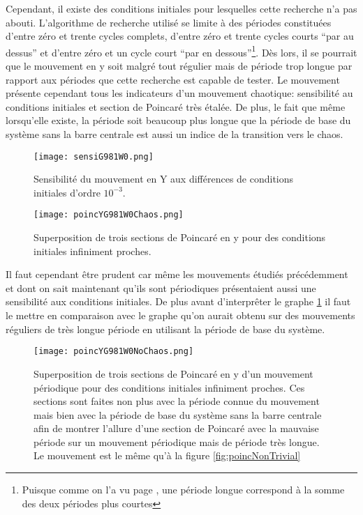 \documentclass[a4paper]{report}
\begin{document}
Cependant, il existe des conditions initiales pour lesquelles cette recherche n'a pas abouti. L'algorithme de recherche utilisé se limite à des périodes constituées d'entre zéro et trente cycles complets, d'entre zéro et trente cycles courts ``par au dessus'' et d'entre zéro et un cycle court ``par en dessous''\footnote{Puisque comme on l'a vu page \pageref{propr:sommePeriodes}, une période longue correspond à la somme des deux périodes plus courtes}. Dès lors, il se pourrait que le mouvement en y soit malgré tout régulier mais de période trop longue par rapport aux périodes que cette recherche est capable de tester. Le mouvement présente cependant tous les indicateurs d'un mouvement chaotique: sensibilité au conditions initiales et section de Poincaré très étalée. De plus, le fait que même lorsqu'elle existe, la période soit beaucoup plus longue que la période de base du système sans la barre centrale est aussi un indice de la transition vers le chaos.
\begin{figure}[h!]
   \texttt{[image: sensiG981W0.png]}
      \caption[Sensibilité aux conditions initiales: g=9.81 .]{Sensibilité du mouvement en Y aux différences de conditions initiales d'ordre \(10^{-3}\).}
\end{figure}
\begin{figure}[H]
   \texttt{[image: poincYG981W0Chaos.png]}
      \caption[Section de Poincaré en y: g=9.81 ]{Superposition de trois sections de Poincaré en y pour des conditions initiales infiniment proches.\label{fig:poincGChaos}}
\end{figure}
Il faut cependant être prudent car même les mouvements étudiés précédemment et dont on sait maintenant qu'ils sont périodiques présentaient aussi une sensibilité aux conditions initiales. De plus avant d'interprêter le graphe \ref{fig:poincGChaos} il faut le mettre en comparaison avec le graphe qu'on aurait obtenu sur des mouvements réguliers de très longue période en utilisant la période de base du système.
\begin{figure}[h!]
   \texttt{[image: poincYG981W0NoChaos.png]}
      \caption[Section de Poincaré en y d'un mouvement périodique: g=9.81 ]{Superposition de trois sections de Poincaré en y d'un mouvement périodique pour des conditions initiales infiniment proches. Ces sections sont faites non plus avec la période connue du mouvement mais bien avec la période de base du système sans la barre centrale afin de montrer l'allure d'une section de Poincaré avec la mauvaise période sur un mouvement périodique mais de période très longue. Le mouvement est le même qu'à la figure \ref{fig:poincNonTrivial}}
\end{figure}
\end{document}
